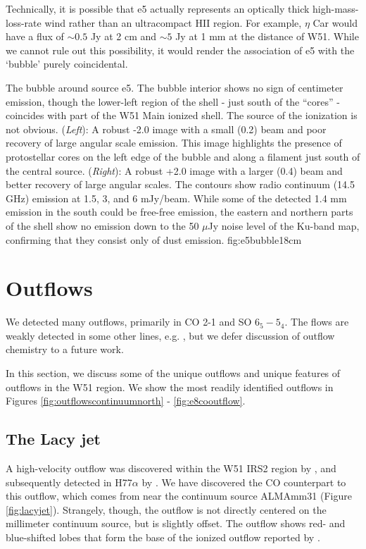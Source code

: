 \documentclass{emulateapj}
\begin{document}
Technically, it is possible that e5 actually represents an optically thick
high-mass-loss-rate wind rather than an ultracompact HII region. 
For example, $\eta$ Car would have a flux of $\sim0.5$ Jy at 2 cm
and $\sim5$ Jy at 1 mm at the distance of W51.  While we cannot rule out
this possibility, it would render the association of e5 with the `bubble'
purely coincidental.

{The bubble around source e5.  The bubble interior shows no sign of centimeter
emission, though the lower-left region of the shell - just south of the
``cores'' - coincides with part of the W51 Main ionized shell.  The source of
the ionization is not obvious.
({\it Left}): A robust -2.0 image with a small (0.2\arcsec) beam and poor
recovery of large angular scale emission.  This image highlights the presence
of protostellar cores on the left edge of the bubble and along a filament just
south of the central source.
({\it Right}): A robust +2.0 image with a larger (0.4\arcsec) beam and better
recovery of large angular scales.  The contours show radio continuum (14.5 GHz)
emission at 1.5, 3, and 6 mJy/beam.  While some of the detected 1.4 mm emission
in the south could be free-free emission, the eastern and northern parts of the
shell show no emission down to the 50 $\mu$Jy noise level of the Ku-band map,
confirming that they consist only of dust emission.
}{fig:e5bubble}{1}{8cm}


\section{Outflows}
\label{sec:outflows}
We detected many outflows, primarily in CO 2-1 and SO $6_5-5_4$.  The flows are
weakly detected in some other lines, e.g. \formaldehyde, but we defer
discussion of outflow chemistry to a future work.

In this section, we discuss some of the unique outflows and unique features of
outflows in the W51 region.  We show the most readily identified outflows in
Figures \ref{fig:outflowscontinuumnorth} - \ref{fig:e8cooutflow}.

\subsection{The Lacy jet}
\label{sec:lacyjet}
A high-velocity outflow was discovered within the W51 IRS2 region by
\citet{Lacy2007a}, and subsequently detected in H77$\alpha$ by
\citet{Ginsburg2016b}.  We have discovered the CO counterpart to this
outflow, which comes from near the continuum source ALMAmm31 (Figure
\ref{fig:lacyjet}).  Strangely, though, the outflow is not directly centered on
the millimeter continuum source, but is slightly offset.  The outflow shows red- and
blue-shifted lobes that form the base of the ionized outflow reported by
\citet[][Figure \ref{fig:outflowscontinuumnorth}]{Lacy2007a}.
\end{document}
